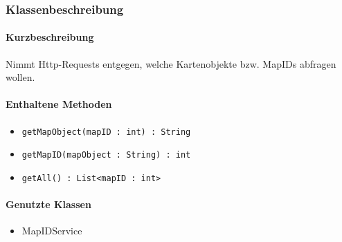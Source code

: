 \subsubsection*{Klassenbeschreibung}%
\paragraph*{Kurzbeschreibung}
Nimmt Http-Requests entgegen, welche Kartenobjekte bzw. MapIDs abfragen wollen.
\paragraph*{Enthaltene Methoden}
\begin{itemize}
    \item \texttt{getMapObject(mapID : int) : String}
    \item \texttt{getMapID(mapObject : String) : int}
    \item \texttt{getAll() : List<mapID : int>}
\end{itemize}
\paragraph*{Genutzte Klassen}
\begin{itemize}
    \item MapIDService
\end{itemize}
